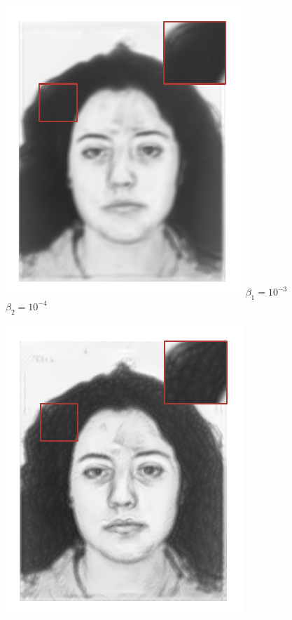 \documentclass[10pt,twocolumn,letterpaper]{article}
\begin{document}
\begin{figure}[htbp]
\begin{minipage}[t]{0.16\linewidth}
\includegraphics[width=0.99\linewidth]{img/effective_eval/4_alpha.pdf}
$\beta_1  = 10^{-3} $\\
$\beta_2  = 10^{-4} $
\end{minipage}
\begin{minipage}[t]{0.16\linewidth}
\centering
\includegraphics[width=0.99\linewidth]{img/effective_eval/3_alpha.pdf}

\end{minipage}
\end{figure}
\end{document}
